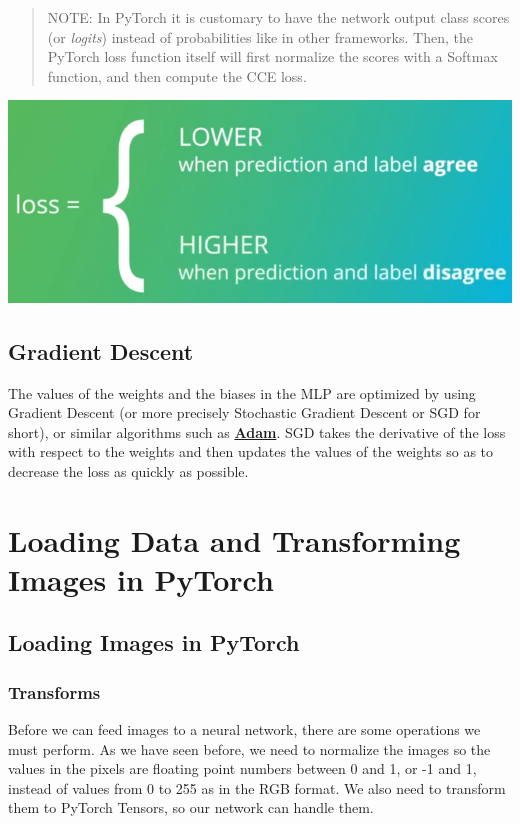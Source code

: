 \begin{quote}
NOTE: In PyTorch it is customary to have the network output class scores (or \textit{logits}) instead of probabilities like in other frameworks. Then, the PyTorch loss function itself will first normalize the scores with a Softmax function, and then compute the CCE loss.

\end{quote}

\includegraphics[width=0.5\linewidth]{img//cnn/image4.png}

\subsection{Gradient Descent}

The values of the weights and the biases in the MLP are optimized by using Gradient Descent (or more precisely Stochastic Gradient Descent or SGD for short), or similar algorithms such as \href{https://optimization.cbe.cornell.edu/index.php?title=Adam}{\textbf{Adam}}. SGD takes the derivative of the loss with respect to the weights and then updates the values of the weights so as to decrease the loss as quickly as possible.

\section{Loading Data and Transforming Images in PyTorch}

\subsection{Loading Images in PyTorch}

\subsubsection{Transforms}

Before we can feed images to a neural network, there are some operations we must perform. As we have seen before, we need to normalize the images so the values in the pixels are floating point numbers between 0 and 1, or -1 and 1, instead of values from 0 to 255 as in the RGB format. We also need to transform them to PyTorch Tensors, so our network can handle them. \newline

